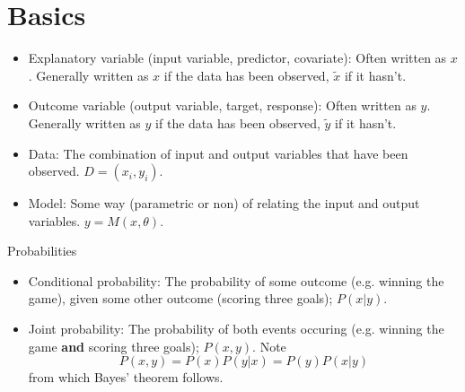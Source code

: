 \documentclass{article}
\begin{document}
\noindent{}

\section{Basics}
\begin{itemize}
    \item Explanatory variable (input variable, predictor, covariate): Often written as $x$. Generally written as $x$ if the data has been observed, $\tilde{x}$ if it hasn't.
    \item Outcome variable (output variable, target, response): Often written as $y$. Generally written as $y$ if the data has been observed, $\tilde{y}$ if it hasn't.
    \item Data: The combination of input and output variables that have been observed. $D = {(x_i, y_i)}$.
    \item Model: Some way (parametric or non) of relating the input and output variables. $y = M(x, \theta)$.
\end{itemize}

Probabilities
\begin{itemize}
    \item Conditional probability: The probability of some outcome (e.g. winning the game), given some other outcome (scoring three goals); $P(x | y)$.
    \item Joint probability: The probability of both events occuring (e.g. winning the game {\bf and} scoring three goals); $P(x, y)$. Note
        \begin{equation}
            P(x, y) = P(x) P(y | x) = P(y) P(x | y)
        \end{equation}
        from which Bayes' theorem follows.

\end{itemize}
\end{document}
